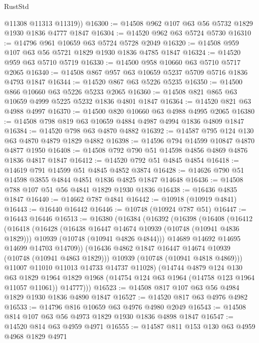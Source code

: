 \begin{lexlean}{RustStd}
\begin{coremodule}
{\begin{coremodule}
{{{{{        @11308
        @11313
        @11319))
@16300 := @14508 @962 @107 @63 @56 @5732 @1829 @1930 @1836 @4777 @1847
@16304 := @14520 @962 @63 @5724 @5730
@16310 := @14796 @961 @10659 @63 @5724 @5728 @2049
@16320 := @14508 @959 @107 @63 @56 @5721 @1829 @1930 @1836 @4785 @1847
@16324 := @14520 @959 @63 @5710 @5719
@16330 := @14500 @958 @10660 @63 @5710 @5717 @2065
@16340 := @14508 @867 @957 @63 @10659 @5237 @5709 @5716 @1836 @4793 @1847
@16344 := @14520 @867 @63 @5226 @5235
@16350 := @14500 @866 @10660 @63 @5226 @5233 @2065
@16360 := @14508 @821 @865 @63 @10659 @4999 @5225 @5232 @1836 @4801 @1847
@16364 := @14520 @821 @63 @4988 @4997
@16370 := @14500 @820 @10660 @63 @4988 @4995 @2065
@16380 := @14508 @798 @819 @63 @10659 @4884 @4987 @4994 @1836 @4809 @1847
@16384 := @14520 @798 @63 @4870 @4882
@16392 := @14587 @795 @124 @130 @63 @4870 @4879 @1829 @4882
@16398 := @14596 @794 @14599 @10847 @4870 @4877 @1950
@16408 := @14508 @792 @790 @51 @14598 @4856 @4869 @4876 @1836 @4817 @1847
@16412 := @14520 @792 @51 @4845 @4854
@16418 := @14619 @791 @14599 @51 @4845 @4852 @3874
@16428 := @14626 @790 @51 @14598 @3855 @4844 @4851 @1836 @4825 @1847 @14648
@16436 := @14508 @788 @107 @51 @56 @4841 @1829 @1930 @1836
@16438 := @16436 @4835 @1847
@16440 := @14662 @787 @4841
@16442 := @10918 (@10919 @4841)
@16443 := @16440 @16442
@16446 := @10748 (@10924 @787 @51)
@16447 := @16443 @16446
@16513 := @16380
    (@16384
      (@16392
        (@16398
          (@16408
            (@16412
              (@16418
                (@16428
                  (@16438 @16447 @14674 @10939 (@10748 (@10941 @4836 @1829)))
                  @10939
                  (@10748 (@10941 @4826 @4844)))
                @14689
                @14692
                @14695
                @14699
                @14703
                @14709))
            (@16436 @4862 @1847 @16447 @14674 @10939 (@10748 (@10941 @4863 @1829)))
            @10939
            (@10748 (@10941 @4818 @4869)))
          @11007
          @11010
          @11013
          @14733
          @14737
          @11028)
        (@14744
          @4879
          @124
          @130
          @63
          @1829
          @1964
          @1829
          @1968
          (@14754 @124 @63 @1964 (@14758 @123 @1964 @11057 @11061))
          @14777)))
@16523 := @14508 @817 @107 @63 @56 @4984 @1829 @1930 @1836 @4890 @1847
@16527 := @14520 @817 @63 @4976 @4982
@16533 := @14796 @816 @10659 @63 @4976 @4980 @2049
@16543 := @14508 @814 @107 @63 @56 @4973 @1829 @1930 @1836 @4898 @1847
@16547 := @14520 @814 @63 @4959 @4971
@16555 := @14587 @811 @153 @130 @63 @4959 @4968 @1829 @4971
}}}}}
\end{coremodule}}
\end{coremodule}
\end{lexlean}
